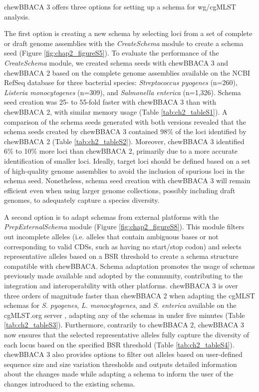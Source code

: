 chewBBACA 3 offers three options for setting up a schema for \ac{wg/cgMLST} analysis.

The first option is creating a new schema by selecting loci from a set of complete or draft genome assemblies with the \textit{CreateSchema} module to create a schema seed (Figure \ref{fig:chap2_figureS5}). To evaluate the performance of the \textit{CreateSchema} module, we created schema seeds with chewBBACA 3 and chewBBACA 2 based on the complete genome assemblies available on the \ac{NCBI} RefSeq database \citep{sayers_database_2022} for three bacterial species: \textit{Streptococcus pyogenes} (n=260), \textit{Listeria monocytogenes} (n=309), and \textit{Salmonella enterica} (n=1,326). Schema seed creation was 25- to 55-fold faster with chewBBACA 3 than with chewBBACA 2, with similar memory usage (Table \ref{tab:ch2_tableS1}). A comparison of the schema seeds generated with both versions revealed that the schema seeds created by chewBBACA 3 contained 98\% of the loci identified by chewBBACA 2 (Table \ref{tab:ch2_tableS2}). Moreover, chewBBACA 3 identified 6\% to 10\% more loci than chewBBACA 2, primarily due to a more accurate identification of smaller loci. Ideally, target loci should be defined based on a set of high-quality genome assemblies to avoid the inclusion of spurious loci in the schema seed. Nonetheless, schema seed creation with chewBBACA 3 will remain efficient even when using larger genome collections, possibly including draft genomes, to adequately capture a species diversity.

A second option is to adapt schemas from external platforms with the \textit{PrepExternalSchema} module (Figure \ref{fig:chap2_figureS8}). This module filters out incomplete alleles (i.e. alleles that contain ambiguous bases or not corresponding to valid \ac{CDSs}, such as having no start/stop codon) and selects representative alleles based on a \ac{BSR} threshold to create a schema structure compatible with chewBBACA. Schema adaptation promotes the usage of schemas previously made available and adopted by the community, contributing to the integration and interoperability with other platforms. chewBBACA 3 is over three orders of magnitude faster than chewBBACA 2 when adapting the \ac{cgMLST} schemas for \textit{S. pyogenes}, \textit{L. monocytogenes}, and \textit{S. enterica} available on the cgMLST.org server \citep{noauthor_cgmlstorg_nodate}, adapting any of the schemas in under five minutes (Table \ref{tab:ch2_tableS3}). Furthermore, contrarily to chewBBACA 2, chewBBACA 3 now ensures that the selected representative alleles fully capture the diversity of each locus based on the specified \ac{BSR} threshold (Table \ref{tab:ch2_tableS4}). chewBBACA 3 also provides options to filter out alleles based on user-defined sequence size and size variation thresholds and outputs detailed information about the changes made while adapting a schema to inform the user of the changes introduced to the existing schema.

